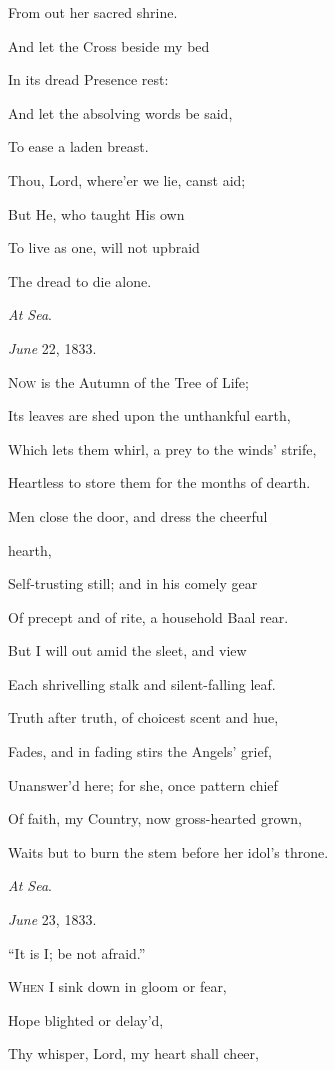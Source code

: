 From out her sacred shrine.

And let the Cross beside my bed

In its dread Presence rest:

And let the absolving words be said,

To ease a laden breast. 

Thou, Lord, where'er we lie, canst aid;

But He, who taught His own

To live as one, will not upbraid

The dread to die alone.

\emph{At Sea}.

\emph{June} 22, 1833.


N\textsc{ow} is the Autumn of the Tree of Life;

Its leaves are shed upon the unthankful
earth,

Which lets them whirl, a prey to the winds' strife,

Heartless to store them for the months of
dearth.

Men close the door, and dress the cheerful

hearth,

Self-trusting still; and in his comely gear

Of precept and of rite, a household Baal rear.

But I will out amid the sleet, and view

Each shrivelling stalk and silent-falling leaf.

Truth after truth, of choicest scent and hue,

Fades, and in fading stirs the Angels' grief,

Unanswer'd here; for she, once pattern chief

Of faith, my Country, now gross-hearted grown,

Waits but to burn the stem before her idol's throne.

\emph{At Sea}.

\emph{June} 23, 1833.


``It is I; be not afraid.''

W\textsc{hen} I sink down in gloom or fear,

Hope blighted or delay'd,

Thy whisper, Lord, my heart shall cheer,

